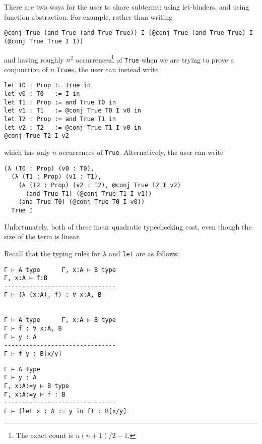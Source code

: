 There are two ways for the user to share subterms: using let-binders, and using function abstraction.
For example, rather than writing
\begin{verbatim}
@conj True (and True (and True True)) I (@conj True (and True True) I (@conj True True I I))
\end{verbatim}
and having roughly $n^2$ occurrences\footnote{The exact count is $n(n+1)/2 - 1$.} of \texttt{True} when we are trying to prove a conjunction of $n$ \texttt{True}s, the user can instead write
\begin{verbatim}
let T0 : Prop := True in
let v0 : T0   := I in
let T1 : Prop := and True T0 in
let v1 : T1   := @conj True T0 I v0 in
let T2 : Prop := and True T1 in
let v2 : T2   := @conj True T1 I v0 in
@conj True T2 I v2
\end{verbatim}
which has only $n$ occurrences of \texttt{True}.
Alternatively, the user can write
\begin{verbatim}
(λ (T0 : Prop) (v0 : T0),
  (λ (T1 : Prop) (v1 : T1),
    (λ (T2 : Prop) (v2 : T2), @conj True T2 I v2)
      (and True T1) (@conj True T1 I v1))
    (and True T0) (@conj True T0 I v0))
  True I
\end{verbatim}

Unfortunately, both of these incur quadratic typechecking cost, even though the size of the term is linear.

Recall that the typing rules for $\lambda$ and \texttt{let} are as follows:
\begin{verbatim}
Γ ⊢ A type      Γ, x:A ⊢ B type
Γ, x:A ⊢ f:B
-------------------------------
Γ ⊢ (λ (x:A), f) : ∀ x:A, B


Γ ⊢ A type      Γ, x:A ⊢ B type
Γ ⊢ f : ∀ x:A, B
Γ ⊢ y : A
-------------------------------
Γ ⊢ f y : B[x/y]
\end{verbatim}
    
\begin{verbatim}
Γ ⊢ A type
Γ ⊢ y : A
Γ, x:A:=y ⊢ B type
Γ, x:A:=y ⊢ f : B
-------------------------------
Γ ⊢ (let x : A := y in f) : B[x/y]
\end{verbatim}

